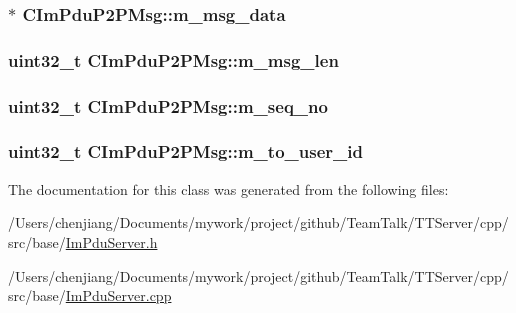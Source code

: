 \subsubsection[{m\+\_\+msg\+\_\+data}]{$\ast$ C\+Im\+Pdu\+P2\+P\+Msg\+::m\+\_\+msg\+\_\+data\hspace{0.3cm}{\ttfamily [private]}}\label{class_c_im_pdu_p2_p_msg_a1a27cdc711b632f3861a9744bcf05c4d}
\hypertarget{class_c_im_pdu_p2_p_msg_ad2dc1b03ae168a0d32ea38061f5d1f37}{}
\subsubsection[{m\+\_\+msg\+\_\+len}]{\setlength{\rightskip}{0pt plus 5cm}uint32\+\_\+t C\+Im\+Pdu\+P2\+P\+Msg\+::m\+\_\+msg\+\_\+len\hspace{0.3cm}{\ttfamily [private]}}\label{class_c_im_pdu_p2_p_msg_ad2dc1b03ae168a0d32ea38061f5d1f37}
\hypertarget{class_c_im_pdu_p2_p_msg_a6d7673031536d05f798d0add66fcee23}{}
\subsubsection[{m\+\_\+seq\+\_\+no}]{\setlength{\rightskip}{0pt plus 5cm}uint32\+\_\+t C\+Im\+Pdu\+P2\+P\+Msg\+::m\+\_\+seq\+\_\+no\hspace{0.3cm}{\ttfamily [private]}}\label{class_c_im_pdu_p2_p_msg_a6d7673031536d05f798d0add66fcee23}
\hypertarget{class_c_im_pdu_p2_p_msg_a8afd2df28f20c7c78d3de0b67c5bab3b}{}
\subsubsection[{m\+\_\+to\+\_\+user\+\_\+id}]{\setlength{\rightskip}{0pt plus 5cm}uint32\+\_\+t C\+Im\+Pdu\+P2\+P\+Msg\+::m\+\_\+to\+\_\+user\+\_\+id\hspace{0.3cm}{\ttfamily [private]}}\label{class_c_im_pdu_p2_p_msg_a8afd2df28f20c7c78d3de0b67c5bab3b}


The documentation for this class was generated from the following files\+:\begin{DoxyCompactItemize}
\item 
/\+Users/chenjiang/\+Documents/mywork/project/github/\+Team\+Talk/\+T\+T\+Server/cpp/src/base/\hyperlink{_im_pdu_server_8h}{Im\+Pdu\+Server.\+h}\item 
/\+Users/chenjiang/\+Documents/mywork/project/github/\+Team\+Talk/\+T\+T\+Server/cpp/src/base/\hyperlink{_im_pdu_server_8cpp}{Im\+Pdu\+Server.\+cpp}\end{DoxyCompactItemize}
